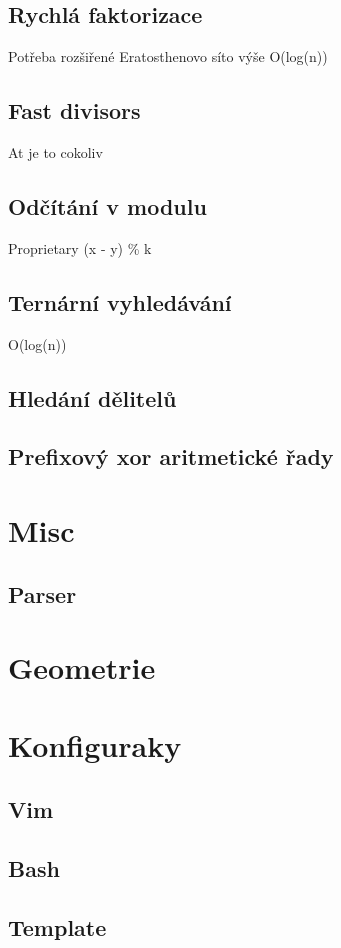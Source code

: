 \documentclass[10pt, a4paper]{article}
\begin{document}
\subsection{Rychlá faktorizace}
Potřeba rozšiřené Eratosthenovo síto výše
O(log(n))


\subsection{Fast divisors}
At je to cokoliv


\subsection{Odčítání v modulu}
Proprietary (x - y) \% k


\subsection{Ternární vyhledávání}
O(log(n))


\subsection{Hledání dělitelů}


\subsection{Prefixový xor aritmetické řady}


\newpage

\section{Misc}

\subsection{Parser}


\newpage

\section{Geometrie}


\newpage

\section{Konfiguraky}
\subsection{Vim}

\subsection{Bash}

\subsection{Template}

\end{document}
